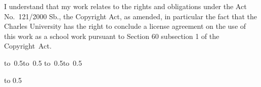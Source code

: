 \medskip\noindent
I understand that my work relates to the rights and obligations under the Act No.~121/2000 Sb.,
the Copyright Act, as amended, in particular the fact that the Charles
University has the right to conclude a license agreement on the use of this
work as a school work pursuant to Section 60 subsection 1 of the Copyright~Act.

\vspace{10mm}

\hbox{\hbox to 0.5\hbox to 0.5\hsize{\dotfill\quad}}
\smallskip
\hbox{\hbox to 0.5\hsize{}\hbox to 0.5}

\vspace{20mm}
\newpage


\openright

\noindent
\Dedication

\newpage


\openright

\vbox to 0.5

\newpage

\openright
\pagestyle{plain}
\setcounter{page}{1}